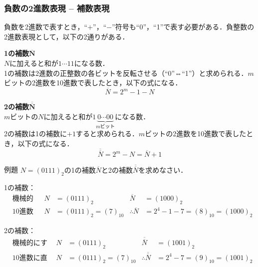 \subsubsection{負数の2進数表現 -- 補数表現}\label{sec:com_arch-2-C-4}

負数を2進数で表すとき，“$+$”，“$-$”符号も“0”，“1”で表す必要がある．負整数の2進数表現として，以下の2通りがある．

\begin{enumerate}[label=\textbf{[\arabic*]}, labelsep=10pt, leftmargin=23pt]
	\item \textbf{1の補数$\bm{\overline{N}}$}\\
		$N$に加えると和が$1\cdots 11$になる数．\\
		1の補数は2進数の正整数の各ビットを反転させる（“0”⇔“1”）と求められる．$m$ビットの2進数を10進数で表したとき，以下の式になる．
		\begin{equation}
			\overline{N} = 2^m - 1 - N
		\end{equation}
	\item \textbf{2の補数$\bm{\overline{\overline{N}}}$}\\
		$m$ビットの$N$に加えると和が$1\underbrace{0\cdots 00}_{\text{$m$ビット}}$になる数．\\
		2の補数は1の補数に$+1$すると求められる．$m$ビットの2進数を10進数で表したとき，以下の式になる．
		\begin{equation}
			\overline{\overline{N}} = 2^m - N = \overline{N} + 1
		\end{equation}
\end{enumerate}

\begin{tip}{例題}
	\textsf{$N = (0111)_{2}$の1の補数$\overline{N}$と2の補数$\overline{\overline{N}}$を求めなさい．}

	\tcblower

	1の補数：
	\begin{align*}
		&\text{機械的にする場合} & N &= (0111)_{2} & \overline{N} &= (1000)_{2}\\
		&\text{10進数に直して考える場合} & N &= (0111)_{2} = (7)_{10} & \therefore \overline{N} &= 2^4 - 1 - 7 = (8)_{10} = (1000)_{2}
	\end{align*}

	2の補数：
	\begin{align*}
		&\text{機械的にする場合} & N &= (0111)_{2} & \overline{\overline{N}} &= (1001)_{2}\\
		&\text{10進数に直して考える場合} & N &= (0111)_{2} = (7)_{10} & \therefore \overline{\overline{N}} &= 2^4 - 7 = (9)_{10} = (1001)_{2}
	\end{align*}
\end{tip}

